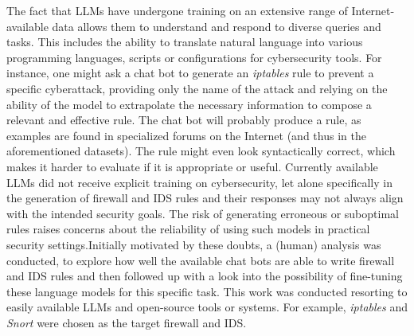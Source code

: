 \documentclass[sigconf]{acmart}
\begin{document}
The fact that LLMs have undergone training on an extensive range of Internet-available data allows them to understand and respond to diverse queries and tasks. This includes the ability to translate natural language into various programming languages, scripts or configurations for cybersecurity tools. For instance, one might ask a chat bot to generate an \textit{iptables} rule to prevent a specific cyberattack, providing only the name of the attack and relying on the ability of the model to extrapolate the necessary information to compose a relevant and effective rule. The chat bot will probably produce a rule, as examples are found in specialized forums on the Internet (and thus in the aforementioned datasets). The rule might even look syntactically correct, which makes it harder to evaluate if it is appropriate or useful. Currently available LLMs did not receive explicit training on cybersecurity, let alone specifically in the generation of firewall and IDS rules and their responses may not always align with the intended security goals. The risk of generating erroneous or suboptimal rules raises concerns about the reliability of using such models in practical security settings.Initially motivated by these doubts, a (human) analysis was conducted, to explore how well the available chat bots are able to write firewall and IDS rules and then followed up with a look into the possibility of fine-tuning these language models for this specific task. This work was conducted resorting to easily available LLMs and open-source tools or systems. For example, \textit{iptables} \cite{Russell98} and \textit{Snort} \cite{Roesch98} were chosen as the target firewall and IDS.
\end{document}
